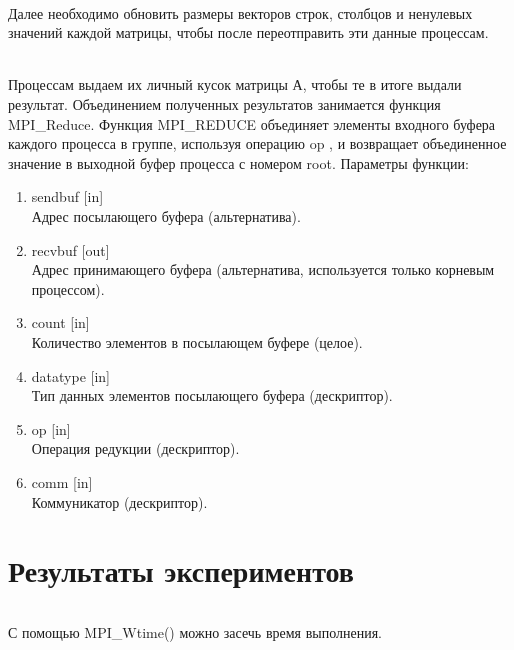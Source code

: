 \documentclass[12pt,a4paper]{article}
\begin{document}
\paragraph{}Далее необходимо обновить размеры векторов строк, столбцов и ненулевых значений каждой матрицы, чтобы после переотправить эти данные процессам.
\paragraph{}Процессам выдаем их личный кусок матрицы А, чтобы те в итоге выдали результат. Объединением полученных результатов занимается функция MPI\_Reduce. Функция MPI\_REDUCE объединяет элементы входного буфера каждого процесса в группе, используя операцию op , и возвращает объединенное значение в выходной буфер процесса с номером root. Параметры функции:
\begin{enumerate} 
\item sendbuf [in]\\
Адрес посылающего буфера (альтернатива).
\item recvbuf [out]\\
Адрес принимающего буфера (альтернатива, используется только корневым процессом).
\item count [in]\\
Количество элементов в посылающем буфере (целое).
\item datatype [in]\\
Тип данных элементов посылающего буфера (дескриптор).
\item op [in]\\
Операция редукции (дескриптор).
\item comm [in]\\
Коммуникатор (дескриптор).
\end{enumerate} 

\part*{Результаты экспериментов}
\paragraph{}С помощью MPI\_Wtime() можно засечь время выполнения.
\end{document}
